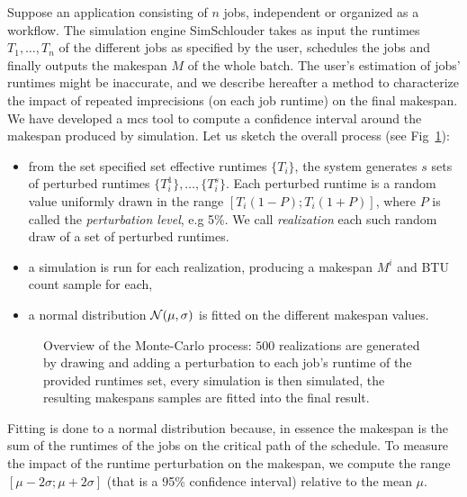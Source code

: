 \documentclass[10pt,conference,compsocconf]{IEEEtran}
\begin{document}
Suppose an  application consisting of  $n$ jobs,  independent or organized  as a
workflow.   The  simulation engine  SimSchlouder  takes  as input  the  runtimes
$T_1, \ldots ,  T_n$ of the different  jobs as specified by  the user, schedules
the jobs and  finally outputs the makespan  $M$ of the whole  batch.  The user's
estimation of  jobs' runtimes might be  inaccurate, and we describe  hereafter a
method to characterize the impact of repeated imprecisions (on each job runtime)
on the  final makespan.  We  have developed a \ac{mcs}  tool to compute a
confidence interval around the makespan produced   by   simulation.   Let   us
sketch   the   overall   process   (see Fig~\ref{fig:mc-process}):
\begin{itemize} 
\item from the set specified set effective runtimes $\{T_i\}$, the system
	generates $s$ sets of perturbed runtimes $\{T_i^1\}, \ldots, \{T_i^s\}$.
	Each perturbed runtime is a random value uniformly drawn in the range
	$[T_i (1-P); T_i (1+P)]$, where $P$ is called the \emph{perturbation
	level}, e.g 5\%. We call \emph{realization} each such random draw of a
	set of perturbed runtimes.
\item a simulation  is run for each realization, producing a makespan $M^i$ and
	BTU count sample for each,
\item  a  normal  distribution  ${\cal N}(\mu,\sigma)$  is  fitted  on
	the different makespan values.
\end{itemize}
\begin{figure}
	\centering
	\resizebox{0.5\textwidth}{!}{%
		
		}
\caption{Overview of the Monte-Carlo process: $500$ realizations are generated
by drawing and adding a perturbation to each job's runtime of the provided
runtimes set, every simulation is then simulated, the resulting makespans
samples are fitted into the final result.}\label{fig:mc-process}
\end{figure}
Fitting is done to a normal distribution because, in essence the makespan is the
sum  of the  runtimes of  the jobs  on the  critical path  of the  schedule.  To
measure the impact  of the runtime perturbation on the  makespan, we compute the
range $[\mu-2\sigma;\mu+2\sigma]$ (that is  a 95\% confidence interval) relative
to  the mean  $\mu$. 
\end{document}
